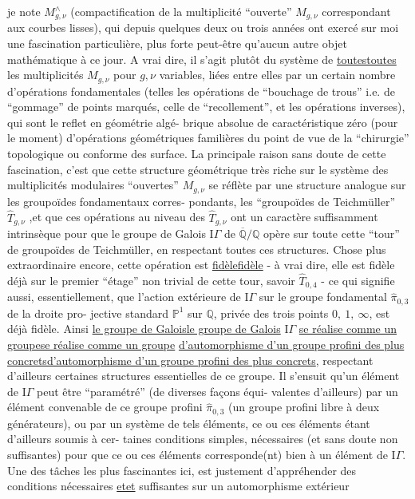 \documentclass[11pt,a4paper]{article}
\let\TextUline\uline
\renewcommand{\uline}[1]{\ifmmode\underline{#1}\else\TextUline{#1}\fi}
\begin{document}
je note $M^{\wedge}_{g,\nu}$ (compactification de la multiplicité ``ouverte''
$M_{g,\nu}$ correspondant aux courbes lisses), qui depuis quelques deux
ou trois années ont exercé sur moi une fascination particulière,
plus forte peut-être qu'aucun autre objet mathématique à ce jour.
A vrai dire, il s'agit plutôt du système de \uline{toutes} les multiplicités
$M_{g,\nu}$ pour $g,\nu$ variables, liées entre elles par un certain nombre
d'opérations fondamentales (telles les opérations de ``bouchage de
trous'' i.e. de ``gommage'' de points marqués, celle de ``recollement'',
et les opérations inverses), qui sont le reflet en géométrie algé-%
brique absolue de caractéristique zéro (pour le moment) d'opérations
géométriques familières du point de vue de la ``chirurgie'' topologique
ou conforme des surface. La principale raison sans doute de cette
fascination, c'est que cette structure géométrique très riche sur le
système des multiplicités modulaires ``ouvertes'' $M_{g,\nu}$ se réflète
par une structure analogue sur les groupoïdes fondamentaux corres-%
pondants, les ``groupoïdes de Teichmüller'' $\hat{T}_{g,\nu}$ ,et que ces opérations
au niveau des $\hat{T}_{g,\nu}$ ont un caractère suffisamment intrinsèque pour
que le groupe de Galois $\mathrm{I}\!\Gamma$ de $\overline{\mathbb{Q}}/\mathbb{Q}$ opère sur toute cette ``tour'' de
groupoïdes de Teichmüller, en respectant toutes ces structures. Chose
plus extraordinaire encore, cette opération est \uline{fidèle} - à vrai dire,
elle est fidèle déjà sur le premier ``étage'' non trivial de cette tour,
savoir $\hat{T}_{0,4}$ - ce qui signifie aussi, essentiellement, que l'action
extérieure de $\mathrm{I}\!\Gamma$ sur le groupe fondamental $\hat{\pi}_{0,3}$ de la droite pro-%
jective standard $\mathbb{P}^1$ sur $\mathbb{Q}$, privée des trois points $0,\ 1,\ \infty$, est
déjà fidèle. Ainsi \uline{le groupe de Galois} $\mathrm{I}\!\Gamma$ \uline{se réalise comme un groupe}
\uline{d'automorphisme d'un groupe profini des plus concrets}, respectant
d'ailleurs certaines structures essentielles de ce groupe. Il s'ensuit
qu'un élément de $\mathrm{I}\!\Gamma$ peut être ``paramétré'' (de diverses façons équi-%
valentes d'ailleurs) par un élément convenable de ce groupe profini
$\hat{\pi}_{0,3}$ (un groupe profini libre à deux générateurs), ou par un système
de tels éléments, ce ou ces éléments étant d'ailleurs soumis à cer-%
taines conditions simples, nécessaires (et sans doute non suffisantes)
pour que ce ou ces éléments corresponde(nt) bien à un élément de $\mathrm{I}\!\Gamma$.
Une des tâches les plus fascinantes ici, est justement d'appréhender
des conditions nécessaires \uline{et} suffisantes sur un automorphisme extérieur
\end{document}
